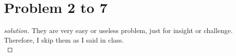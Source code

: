 \section*{Problem 2 to 7}
\begin{proof} [solution]
	They are very easy or useless problem, just for insight or challenge. Therefore, I skip them as I said in class.\\
\end{proof}